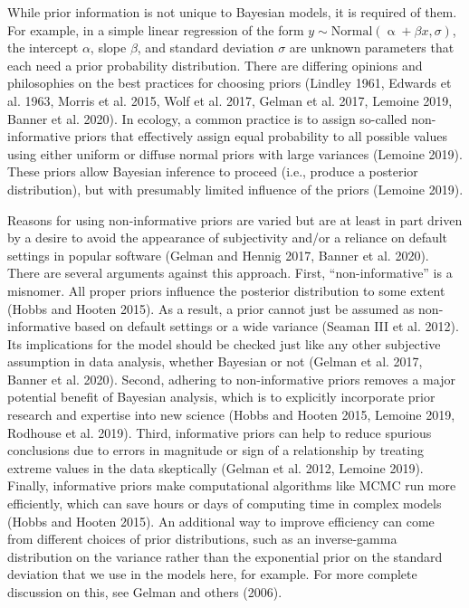 \documentclass[
  12pt,
]{article}
\begin{document}
While prior information is not unique to Bayesian models, it is required
of them. For example, in a simple linear regression of the form
\(y \sim \text{Normal}(\upalpha + \beta x, \sigma)\), the intercept
\(\alpha\), slope \(\beta\), and standard deviation \(\sigma\) are
unknown parameters that each need a prior probability distribution.
There are differing opinions and philosophies on the best practices for
choosing priors (Lindley 1961, Edwards et al. 1963, Morris et al. 2015,
Wolf et al. 2017, Gelman et al. 2017, Lemoine 2019, Banner et al. 2020).
In ecology, a common practice is to assign so-called non-informative
priors that effectively assign equal probability to all possible values
using either uniform or diffuse normal priors with large variances
(Lemoine 2019). These priors allow Bayesian inference to proceed (i.e.,
produce a posterior distribution), but with presumably limited influence
of the priors (Lemoine 2019).

Reasons for using non-informative priors are varied but are at least in
part driven by a desire to avoid the appearance of subjectivity and/or a
reliance on default settings in popular software (Gelman and Hennig
2017, Banner et al. 2020). There are several arguments against this
approach. First, ``non-informative'' is a misnomer. All proper priors
influence the posterior distribution to some extent (Hobbs and Hooten
2015). As a result, a prior cannot just be assumed as non-informative
based on default settings or a wide variance (Seaman III et al. 2012).
Its implications for the model should be checked just like any other
subjective assumption in data analysis, whether Bayesian or not (Gelman
et al. 2017, Banner et al. 2020). Second, adhering to non-informative
priors removes a major potential benefit of Bayesian analysis, which is
to explicitly incorporate prior research and expertise into new science
(Hobbs and Hooten 2015, Lemoine 2019, Rodhouse et al. 2019). Third,
informative priors can help to reduce spurious conclusions due to errors
in magnitude or sign of a relationship by treating extreme values in the
data skeptically (Gelman et al. 2012, Lemoine 2019). Finally,
informative priors make computational algorithms like MCMC run more
efficiently, which can save hours or days of computing time in complex
models (Hobbs and Hooten 2015). An additional way to improve efficiency
can come from different choices of prior distributions, such as an
inverse-gamma distribution on the variance rather than the exponential
prior on the standard deviation that we use in the models here, for
example. For more complete discussion on this, see Gelman and others
(2006).
\end{document}
